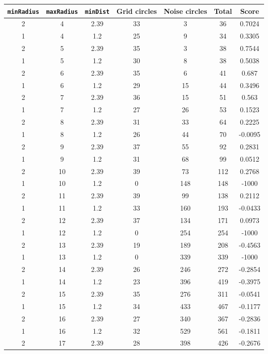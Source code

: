 \documentclass[letterpaper, 12pt]{article}
\begin{document}
\begin{longtable}{|c|c|c|c|c|c|c|}
\hline
\textbf{\texttt{minRadius}} & \textbf{\texttt{maxRadius}} & \textbf{\texttt{minDist}} & \textbf{Grid circles} & \textbf{Noise circles} & \textbf{Total} & \textbf{Score} \\
\hline
2 & 4 & 2.39 & 33 & 3 & 36 & 0.7024 \\
\hline
1 & 4 & 1.2 & 25 & 9 & 34 & 0.3305 \\
\hline
2 & 5 & 2.39 & 35 & 3 & 38 & 0.7544 \\
\hline
1 & 5 & 1.2 & 30 & 8 & 38 & 0.5038 \\
\hline
2 & 6 & 2.39 & 35 & 6 & 41 & 0.687 \\
\hline
1 & 6 & 1.2 & 29 & 15 & 44 & 0.3496 \\
\hline
2 & 7 & 2.39 & 36 & 15 & 51 & 0.563 \\
\hline
1 & 7 & 1.2 & 27 & 26 & 53 & 0.1523 \\
\hline
2 & 8 & 2.39 & 31 & 33 & 64 & 0.2225 \\
\hline
1 & 8 & 1.2 & 26 & 44 & 70 & -0.0095 \\
\hline
2 & 9 & 2.39 & 37 & 55 & 92 & 0.2831 \\
\hline
1 & 9 & 1.2 & 31 & 68 & 99 & 0.0512 \\
\hline
2 & 10 & 2.39 & 39 & 73 & 112 & 0.2768 \\
\hline
1 & 10 & 1.2 & 0 & 148 & 148 & -1000 \\
\hline
2 & 11 & 2.39 & 39 & 99 & 138 & 0.2112 \\
\hline
1 & 11 & 1.2 & 33 & 160 & 193 & -0.0433 \\
\hline
2 & 12 & 2.39 & 37 & 134 & 171 & 0.0973 \\
\hline
1 & 12 & 1.2 & 0 & 254 & 254 & -1000 \\
\hline
2 & 13 & 2.39 & 19 & 189 & 208 & -0.4563 \\
\hline
1 & 13 & 1.2 & 0 & 339 & 339 & -1000 \\
\hline
2 & 14 & 2.39 & 26 & 246 & 272 & -0.2854 \\
\hline
1 & 14 & 1.2 & 23 & 396 & 419 & -0.3975 \\
\hline
2 & 15 & 2.39 & 35 & 276 & 311 & -0.0541 \\
\hline
1 & 15 & 1.2 & 34 & 433 & 467 & -0.1177 \\
\hline
2 & 16 & 2.39 & 27 & 340 & 367 & -0.2836 \\
\hline
1 & 16 & 1.2 & 32 & 529 & 561 & -0.1811 \\
\hline
2 & 17 & 2.39 & 28 & 398 & 426 & -0.2676 \\

\end{longtable}
\end{document}
